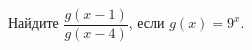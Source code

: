 \begin{ex}
	\begin{condition}
		Найдите \( \dfrac{g(x-1)}{g(x-4)} \), если \( g(x)=9^x \).
	\end{condition}
\end{ex}